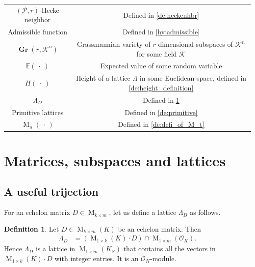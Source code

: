 \documentclass{amsart}
\theoremstyle{definition}
\newtheorem{definition}[theorem]{Definition}
\theoremstyle{remark}
\newcommand{\OK}{\mathcal{O}_K}
\newcommand{\KR}{K_\mathbb{R}}
\DeclareMathOperator{\M}{M}
\DeclareMathOperator{\Gr}{\mathbf{Gr}}
\begin{document}
\begin{center}
\begin{tabular}{ c c }
            $(\mathcal{P},r)$-Hecke neighbor & Defined in \cref{de:heckenhbr} \\
            Admissible function & Defined in \cref{hy:admissible} \\ 
            $\Gr(r,\mathcal{K}^{n})$ & Grassmannian variety of $r$-dimensional subspaces of $\mathcal{K}^{n}$ for some field $\mathcal{K}$ \\ 
            $\mathbb{E}(~\cdot~)$ &  Expected value of some random variable \\ 
            $H(~\cdot~)$ &  Height of a lattice $\Lambda$ in some Euclidean space, defined in \cref{de:height_definition}  \\
            $\Lambda_D$ & Defined in \cref{de:lambda} \\
            Primitive lattices & Defined in \cref{de:primitive}   \\ 
            $\M_{n}(~\cdot~)$  & Defined in \cref{de:defi_of_M_t}
        \end{tabular}
    \end{center}

\fi

\section{Matrices, subspaces and lattices}

\label{se:schmidt}

\subsection{A useful trijection}
For an echelon matrix $D \in \M_{k \times m}$, let us define a lattice $\Lambda_{D}$ as follows.
\begin{definition}
    \label{de:lambda}
    Let $D \in \M_{k \times m}(K)$ be an echelon matrix. Then
    \begin{align}
        \Lambda_D &  = ( \M_{1 \times k}(K)\cdot D ) \cap \M_{1 \times m}(\OK).
        \label{eq:defi_of_lambda}
    \end{align}
    Hence $\Lambda_D$ is a lattice in $\M_{1 \times m}(\KR)$ 
    that contains all the vectors in $\M_{1 \times k}(K) \cdot D$ with integer entries. 
    It is an $\OK$-module. 
\end{definition}
\end{document}
